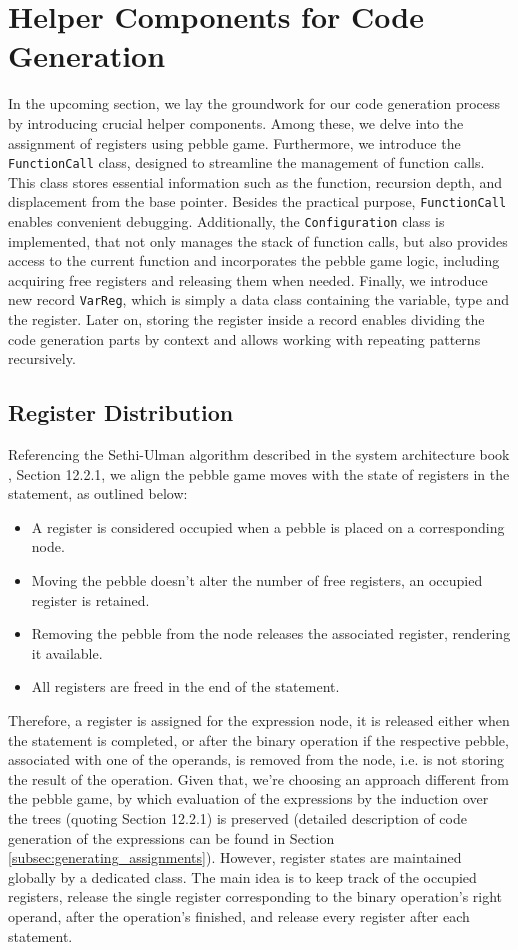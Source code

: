 \section{Helper Components for Code Generation}\label{sec:helpers}
In the upcoming section, we lay the groundwork for our code generation process by introducing crucial
helper components. Among these, we delve into the assignment of registers using pebble game. Furthermore, we
introduce the \verb+FunctionCall+ class, designed to streamline the management of function calls. This class stores
essential information such as the function, recursion depth, and displacement from the base pointer. Besides the practical
purpose, \verb+FunctionCall+ enables convenient debugging. Additionally, the \verb+Configuration+ class is implemented, that
not only manages the stack of function calls, but also provides access to the current function and incorporates the pebble game
logic, including acquiring free registers and releasing them when needed. Finally, we introduce new record \verb+VarReg+, which is
simply a data class containing the variable, type and the register. Later on, storing the register inside a record enables
dividing the code generation parts by context and allows working with repeating patterns recursively.
\subsection{Register Distribution}
Referencing the Sethi-Ulman algorithm described in the system architecture book \cite{sysbook}, Section 12.2.1, we align the pebble game moves with the state of registers in the statement,
as outlined below:
\begin{itemize}
    \item A register is considered occupied when a pebble is placed on a corresponding node.
    \item Moving the pebble doesn't alter the number of free registers, an occupied register is retained.
    \item Removing the pebble from the node releases the associated register, rendering it available.
    \item All registers are freed in the end of the statement.
\end{itemize}
Therefore, a register is assigned for the expression node, it is released either when the statement is completed, or after
the binary operation if the respective pebble, associated with one of the operands, is removed from the node, i.e. is not
storing the result of the operation. Given that, we're choosing an approach different from the pebble game, by which evaluation of
the expressions by the induction over the trees (quoting \cite{sysbook} Section 12.2.1) is preserved (detailed description of code generation
of the expressions can be found in Section \ref{subsec:generating_assignments}). However, register states are
maintained globally by a dedicated class. The main idea is to keep track of the occupied registers, release the single register corresponding to the binary operation's right operand, after the operation's finished,
and release every register after each statement.
